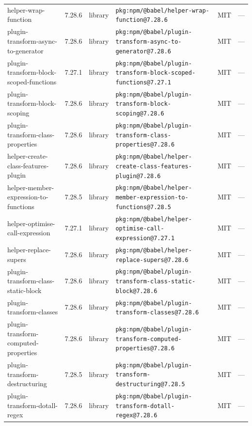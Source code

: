 \documentclass[11pt,a4paper]{article}
\begin{document}
\begin{longtable}{|p{4cm}|p{2cm}|p{1.6cm}|p{5cm}|p{1.5cm}|p{3.5cm}|}
\raggedright helper-wrap-function & 7.28.6 & library & \small\texttt{pkg:npm/@babel/helper-wrap-function@7.28.6} & MIT & \small — \\
\raggedright plugin-transform-async-to-generator & 7.28.6 & library & \small\texttt{pkg:npm/@babel/plugin-transform-async-to-generator@7.28.6} & MIT & \small — \\
\raggedright plugin-transform-block-scoped-functions & 7.27.1 & library & \small\texttt{pkg:npm/@babel/plugin-transform-block-scoped-functions@7.27.1} & MIT & \small — \\
\raggedright plugin-transform-block-scoping & 7.28.6 & library & \small\texttt{pkg:npm/@babel/plugin-transform-block-scoping@7.28.6} & MIT & \small — \\
\raggedright plugin-transform-class-properties & 7.28.6 & library & \small\texttt{pkg:npm/@babel/plugin-transform-class-properties@7.28.6} & MIT & \small — \\
\raggedright helper-create-class-features-plugin & 7.28.6 & library & \small\texttt{pkg:npm/@babel/helper-create-class-features-plugin@7.28.6} & MIT & \small — \\
\raggedright helper-member-expression-to-functions & 7.28.5 & library & \small\texttt{pkg:npm/@babel/helper-member-expression-to-functions@7.28.5} & MIT & \small — \\
\raggedright helper-optimise-call-expression & 7.27.1 & library & \small\texttt{pkg:npm/@babel/helper-optimise-call-expression@7.27.1} & MIT & \small — \\
\raggedright helper-replace-supers & 7.28.6 & library & \small\texttt{pkg:npm/@babel/helper-replace-supers@7.28.6} & MIT & \small — \\
\raggedright plugin-transform-class-static-block & 7.28.6 & library & \small\texttt{pkg:npm/@babel/plugin-transform-class-static-block@7.28.6} & MIT & \small — \\
\raggedright plugin-transform-classes & 7.28.6 & library & \small\texttt{pkg:npm/@babel/plugin-transform-classes@7.28.6} & MIT & \small — \\
\raggedright plugin-transform-computed-properties & 7.28.6 & library & \small\texttt{pkg:npm/@babel/plugin-transform-computed-properties@7.28.6} & MIT & \small — \\
\raggedright plugin-transform-destructuring & 7.28.5 & library & \small\texttt{pkg:npm/@babel/plugin-transform-destructuring@7.28.5} & MIT & \small — \\
\raggedright plugin-transform-dotall-regex & 7.28.6 & library & \small\texttt{pkg:npm/@babel/plugin-transform-dotall-regex@7.28.6} & MIT & \small — \\

\end{longtable}
\end{document}
